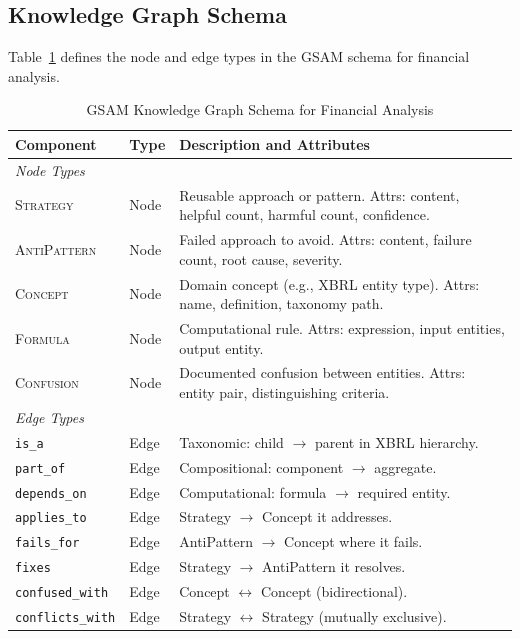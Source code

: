 \documentclass[12pt,a4paper]{article}
\begin{document}
\subsection{Knowledge Graph Schema}
\label{sec:schema}

Table~\ref{tab:schema} defines the node and edge types in the GSAM schema for financial analysis.

\begin{table}[t]
\centering
\caption{GSAM Knowledge Graph Schema for Financial Analysis}
\label{tab:schema}
\small
\begin{tabular}{@{}llp{6.5cm}@{}}
\toprule
\textbf{Component} & \textbf{Type} & \textbf{Description and Attributes} \\
\midrule
\multicolumn{3}{l}{\textit{Node Types}} \\
\midrule
\textsc{Strategy} & Node & Reusable approach or pattern. Attrs: content, helpful count, harmful count, confidence. \\
\textsc{AntiPattern} & Node & Failed approach to avoid. Attrs: content, failure count, root cause, severity. \\
\textsc{Concept} & Node & Domain concept (e.g., XBRL entity type). Attrs: name, definition, taxonomy path. \\
\textsc{Formula} & Node & Computational rule. Attrs: expression, input entities, output entity. \\
\textsc{Confusion} & Node & Documented confusion between entities. Attrs: entity pair, distinguishing criteria. \\
\midrule
\multicolumn{3}{l}{\textit{Edge Types}} \\
\midrule
\texttt{is\_a} & Edge & Taxonomic: child $\rightarrow$ parent in XBRL hierarchy. \\
\texttt{part\_of} & Edge & Compositional: component $\rightarrow$ aggregate. \\
\texttt{depends\_on} & Edge & Computational: formula $\rightarrow$ required entity. \\
\texttt{applies\_to} & Edge & Strategy $\rightarrow$ Concept it addresses. \\
\texttt{fails\_for} & Edge & AntiPattern $\rightarrow$ Concept where it fails. \\
\texttt{fixes} & Edge & Strategy $\rightarrow$ AntiPattern it resolves. \\
\texttt{confused\_with} & Edge & Concept $\leftrightarrow$ Concept (bidirectional). \\
\texttt{conflicts\_with} & Edge & Strategy $\leftrightarrow$ Strategy (mutually exclusive). \\
\bottomrule
\end{tabular}
\end{table}
\end{document}
